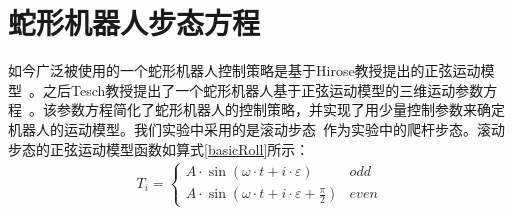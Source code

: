 \section{蛇形机器人步态方程}
如今广泛被使用的一个蛇形机器人控制策略是基于Hirose教授提出的正弦运动模型~\cite{HiroseSine}。之后Tesch教授提出了一个蛇形机器人基于正弦运动模型的三维运动参数方程~\cite{ChosetSine}。该参数方程简化了蛇形机器人的控制策略，并实现了用少量控制参数来确定机器人的运动模型。我们实验中采用的是滚动步态~\cite{Enner2013Motion}作为实验中的爬杆步态。滚动步态的正弦运动模型函数如算式\ref{basicRoll}所示：
\begin{eqnarray}\label{basicRoll}
T_i=\left\{
\begin{array}{lr}
A\cdot \sin (\omega \cdot t + i\cdot \varepsilon )&odd\\
A\cdot \sin (\omega \cdot t + i\cdot \varepsilon +  \frac{\pi}{2})&even
\end{array}
\right.
\end{eqnarray}
